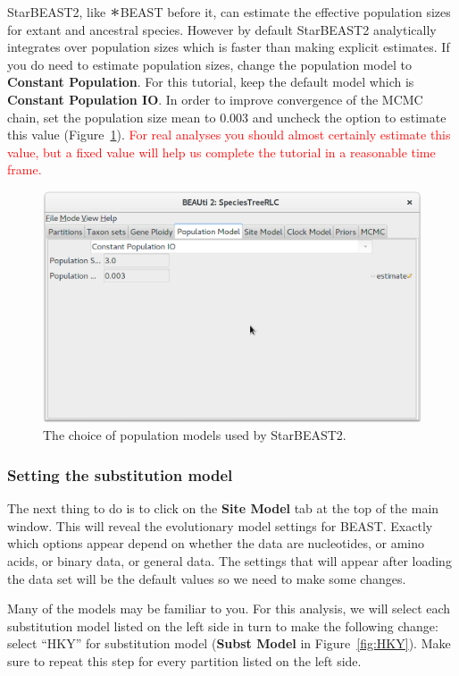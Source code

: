 \documentclass{article}
\newcommand{\Conv}{\mathop{\scalebox{1.5}{$\ast$}}}
\begin{document}
StarBEAST2, like $\Conv$BEAST before it, can estimate the effective population
sizes for extant and ancestral species. However by default StarBEAST2
analytically integrates over population sizes which is faster than making
explicit estimates. If you do need to estimate population sizes, change the
population model to \textbf{Constant Population}. For this tutorial, keep the
default model which is \textbf{Constant Population IO}. In order to improve
convergence of the MCMC chain, set the population size mean to 0.003 and uncheck
the option to estimate this value (Figure~\ref{fig:pop}). \textcolor{red}{For
real analyses you should almost certainly estimate this value, but a fixed value
will help us complete the tutorial in a reasonable time frame.}

\begin{figure}[htb!]
\centering
\includegraphics[width=\textwidth]{figures/beauti-pop-model.png}
\caption{The choice of population models used by StarBEAST2.}
\label{fig:pop}
\end{figure}

\subsubsection*{Setting the substitution model}

The next thing to do is to click on the \textbf{Site Model} tab at the top of
the main window. This will reveal the evolutionary model settings for BEAST.
Exactly which options appear depend on whether the data are nucleotides, or
amino acids, or binary data, or general data. The settings that will appear
after loading the data set will be the default values so we need to make some
changes.

Many of the models may be familiar to you. For this analysis, we will select
each substitution model listed on the left side in turn to make the following
change: select ``HKY'' for substitution model (\textbf{Subst Model} in
Figure~\ref{fig:HKY}). Make sure to repeat this step for every partition listed
on the left side.
\end{document}
